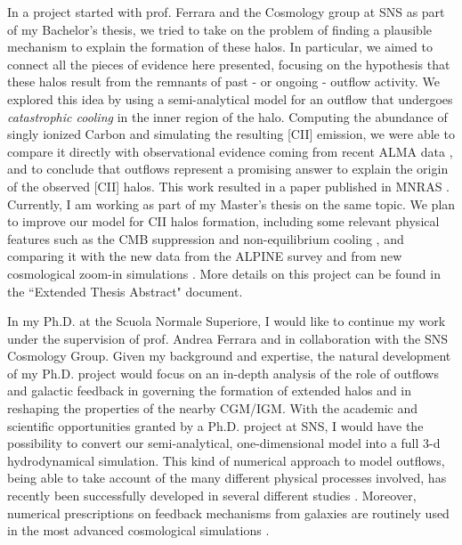 \documentclass[12pt]{article}
\begin{document}
In a project started with prof. Ferrara and the Cosmology group at SNS as part of my Bachelor's thesis, we tried to take on the problem of finding a plausible mechanism to explain the formation of these halos. In particular, we aimed to connect all the pieces of evidence here presented, focusing on the hypothesis that these halos result from the remnants of past - or ongoing - outflow activity. We explored this idea by using a semi-analytical model for an outflow that undergoes \textit{catastrophic cooling} in the inner region of the halo. Computing the abundance of singly ionized Carbon and simulating the resulting [CII] emission, we were able to compare it directly with observational evidence coming from recent ALMA data \citep{Fujimoto19}, and to conclude that outflows represent a promising answer to explain the origin of the observed [CII] halos. This work resulted in a paper published in MNRAS \citep{Pizzati20}. Currently, I am working as part of my Master's thesis on the same topic. We plan to improve our model for CII halos formation, including some relevant physical features such as the CMB suppression \citep{dacunha2013, pallottini2017b, kohandel:2019} and non-equilibrium cooling \citep{gray2019catastrophic}, and comparing it with the new data from the ALPINE survey \citep[ALMA LP,][]{lefevre:2019, faisst:2019, bethermin:2019, Fujimoto:2020qzo} and from new cosmological zoom-in simulations \citep[e.g. SERRA,][]{pallottini:2019}. More details on this project can be found in the ``Extended Thesis Abstract" document.

In my Ph.D. at the Scuola Normale Superiore, I would like to continue my work under the supervision of prof. Andrea Ferrara and in collaboration with the SNS Cosmology Group. Given my background and expertise, the natural development of my Ph.D. project would focus on an in-depth analysis of the role of outflows and galactic feedback in governing the formation of extended halos and in reshaping the properties of the nearby CGM/IGM. With the academic and scientific opportunities granted by a Ph.D. project at SNS, I would have the possibility to convert our semi-analytical, one-dimensional model into a full 3-d hydrodynamical simulation. This kind of numerical approach to model outflows, being able to take account of the many different physical processes involved, has recently been successfully developed in several different studies \citep{Scannapieco:2017, schneider2018introducing,schneider2018production, de2020simulated,schneider2020physical}. Moreover, numerical prescriptions on feedback mechanisms from galaxies are routinely used in the most advanced cosmological simulations \citep{Sijacki:2007rw, Hopkins18}. 
\end{document}
